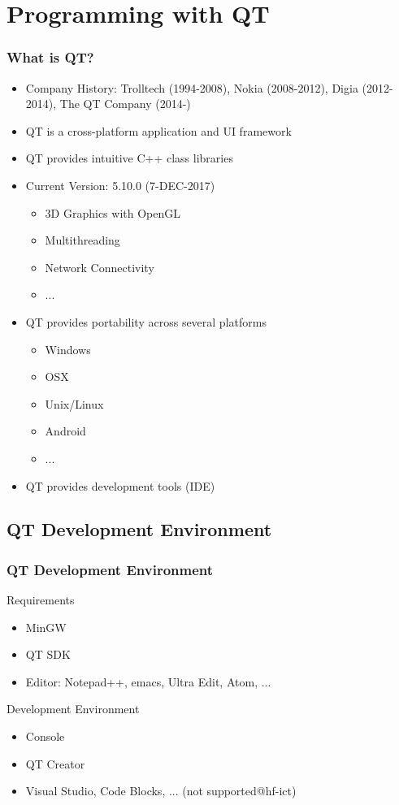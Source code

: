 \section{Programming with QT}

\frame
{
\frametitle{What is QT?}
\begin{itemize}
\item Company History: Trolltech (1994-2008), Nokia (2008-2012), Digia (2012-2014), The QT Company (2014-)
\item QT is a cross-platform application and UI framework
\item QT provides intuitive C++ class libraries
\item Current Version: 5.10.0 (7-DEC-2017)
{\tiny
\begin{itemize}
\item 3D Graphics with OpenGL
\item Multithreading
\item Network Connectivity
\item ...
\end{itemize}
}
\item QT provides portability across several platforms\\
\begin{itemize}
\item Windows
\item OSX
\item Unix/Linux
\item Android
\item ...
\end{itemize}
\item QT provides development tools (IDE)
\end{itemize}
}

\subsection{QT Development Environment}
\frame
{
\frametitle{QT Development Environment}
Requirements
\begin{itemize}
\item MinGW
\item QT SDK
\item Editor: Notepad++, emacs, Ultra Edit, Atom, ...
\end{itemize}
\vspace{5mm}
Development Environment
\begin{itemize}
\item Console
\item QT Creator
\item Visual Studio, Code Blocks, ... (not supported@hf-ict)
\end{itemize}
}

